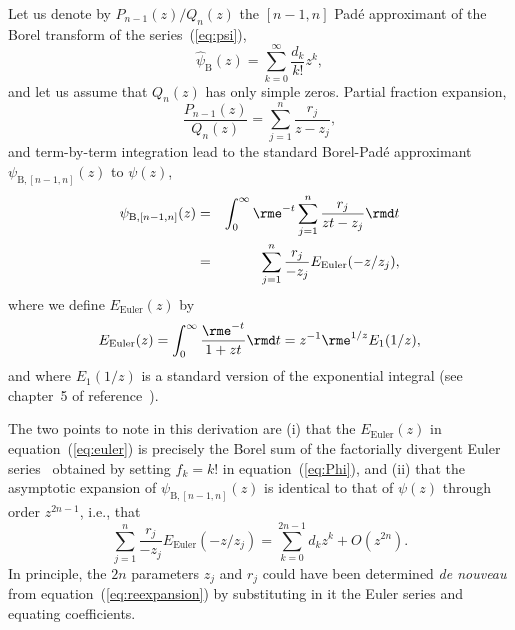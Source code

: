 \documentclass[12pt]{iopart}
\begin{document}
Let us denote by $P_{n-1}(z)/Q_n(z)$ the $[n-1,n]$ Pad\'e approximant of the Borel transform
of the series~(\ref{eq:psi}),
%
\begin{equation}
	\hat{\psi}_\mathrm{B}(z) = \sum_{k=0}^\infty \frac{d_k}{k!} z^k,
\end{equation}
%
and let us assume that $Q_n(z)$ has only simple zeros. Partial fraction expansion,
%
\begin{equation}
	\frac{P_{n-1}(z)}{Q_n(z)} = \sum_{j=1}^n \frac{r_j}{z-z_j},
\end{equation}
%
and term-by-term integration lead to the standard Borel-Pad\'e approximant
$\psi_{\mathrm{B},[n-1,n]}(z)$ to $\psi(z)$,
%
\begin{eqnarray}
	\psi_{\mathrm{B},[n-1,n]}(z) & = & \int_0^\infty \rme^{-t} \sum_{j=1}^n \frac{r_j}{z t-z_j} \rmd t\\
	                                    & = & \sum_{j=1}^n \frac{r_j}{-z_j} E_\mathrm{Euler}(-z/z_j),
\end{eqnarray}
%
where we define $E_\mathrm{Euler}(z)$ by
%
\begin{equation}
	\label{eq:euler}
	E_\mathrm{Euler}(z) = \int_0^\infty \frac{\rme^{-t}}{1+zt} \rmd t
	                          = z^{-1} \rme^{1/z} E_1(1/z) ,
\end{equation}
%
and where $E_1(1/z)$ is a standard version of the exponential integral (see chapter~5 of reference~\cite{AS70}).


The two points to note in this derivation are (i) that the $E_\mathrm{Euler}(z)$ in equation~(\ref{eq:euler})
is precisely the Borel sum of the factorially divergent Euler series~\cite{EL1760} obtained by setting $f_k = k!$
in equation~(\ref{eq:Phi}), and (ii) that the asymptotic expansion of $\psi_{\mathrm{B},[n-1,n]}(z)$ is identical
to that of $\psi(z)$ through order $z^{2n-1}$, i.e., that
%
\begin{equation}
 	\sum_{j=1}^n \frac{r_j}{-z_j} E_\mathrm{Euler} (-z/z_j)
	 = \sum_{k=0}^{2n-1} d_k z^k + O(z^{2n}) .
	\label{eq:reexpansion}
\end{equation}
%
In principle, the $2n$ parameters $z_j$ and $r_j$ could have been determined \emph{de nouveau}
from equation~(\ref{eq:reexpansion}) by substituting in it the Euler series and equating coefficients.
\end{document}
